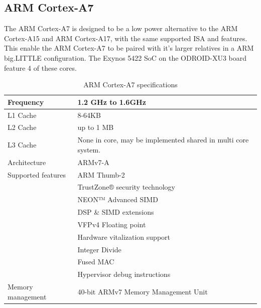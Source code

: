 \subsection{ARM Cortex-A7}
The ARM Cortex-A7 is designed to be a low power alternative to the ARM Cortex-A15 and ARM Cortex-A17, with the same supported ISA and features.
This enable the ARM Cortex-A7 to be paired with it's larger relatives in a ARM big.LITTLE configuration.
The Exynos 5422 SoC on the ODROID-XU3 board feature 4 of these cores.
\begin{table}[H]
  \begin{tabular}{ll}
    \toprule
    Frequency         & 1.2 GHz to 1.6GHz  \\
    \midrule
    L1 Cache          & 8-64KB \\
    L2 Cache          & up to 1 MB \\
    L3 Cache          & None in core, may be implemented shared in multi core system. \\
    \midrule
    Architecture      & ARMv7-A            \\
    \midrule
    Supported features& ARM Thumb-2 \\
                      & TrustZone® security technology \\
                      & NEON™ Advanced SIMD \\
                      & DSP \& SIMD extensions \\
                      & VFPv4 Floating point \\
                      & Hardware vitalization support \\
                      & Integer Divide \\
                      & Fused MAC \\
                      & Hypervisor debug instructions \\
    \midrule
    Memory management & 40-bit ARMv7 Memory Management Unit \\
    \bottomrule
  \end{tabular}
  \caption{ARM Cortex-A7 specifications\label{overflow}}
\end{table}
